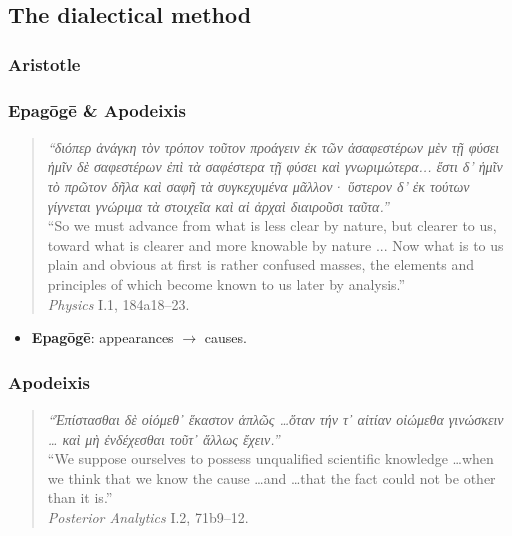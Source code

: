 \subsection{The dialectical method}

\subsubsection{Aristotle}


\subsubsection{Epag\=og\=e \& Apodeixis}

\begin{quote}
\scriptsize
\emph{``{\grk διόπερ ἀνάγκη τὸν τρόπον τοῦτον προάγειν ἐκ τῶν ἀσαφεστέρων μὲν τῇ φύσει ἡμῖν δὲ σαφεστέρων
ἐπὶ τὰ σαφέστερα τῇ φύσει καὶ γνωριμώτερα... ἔστι δ’ ἡμῖν τὸ πρῶτον δῆλα καὶ σαφῆ τὰ συγκεχυμένα μᾶλλον·
ὕστερον δ’ ἐκ τούτων γίγνεται γνώριμα τὰ στοιχεῖα καὶ αἱ ἀρχαὶ διαιροῦσι ταῦτα.}''}
\\[0.6ex]
\footnotesize
``So we must advance from what is less clear by nature, but clearer to us, toward what is clearer and more knowable by nature ... 
Now what is to us plain and obvious at first is rather confused masses, the elements and principles of which become known to us later by analysis.''
\\
\hfill{\scriptsize \textit{Physics} I.1, 184a18--23.}
\end{quote}

\begin{itemize}
  \item \textbf{Epag\=og\=e}: appearances $\rightarrow$ causes.
\end{itemize}

\subsubsection{Apodeixis}

\begin{quote}
\footnotesize
\emph{``{\grk Ἐπίστασθαι δὲ οἰόμεθ᾽ ἕκαστον ἁπλῶς \ldots ὅταν τήν τ᾽ αἰτίαν οἰώμεθα γινώσκειν \ldots
καὶ μὴ ἐνδέχεσθαι τοῦτ᾽ ἄλλως ἔχειν.}''}
\\[0.6ex]
``We suppose ourselves to possess unqualified scientific knowledge \ldots when we think that we know the cause \ldots and \ldots that the fact could not be other than it is.''
\\
\hfill{\scriptsize \textit{Posterior Analytics} I.2, 71b9--12.}
\end{quote}

